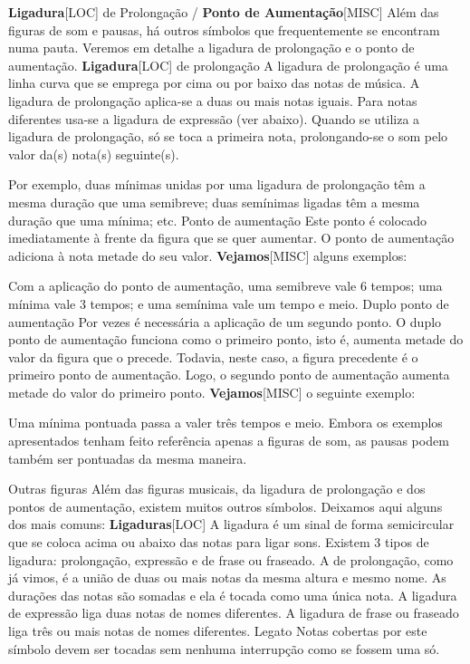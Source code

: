 \documentclass[a4paper,12pt]{article}
\begin{document}
\textbf{Ligadura}\textsc{[LOC]} de Prolongação / \textbf{Ponto de Aumentação}\textsc{[MISC]} Além das figuras de som e pausas, há outros símbolos que frequentemente se encontram numa pauta. Veremos em detalhe a ligadura de prolongação e o ponto de aumentação. \textbf{Ligadura}\textsc{[LOC]} de prolongação A ligadura de prolongação é uma linha curva que se emprega por cima ou por baixo das notas de música. A ligadura de prolongação aplica-se a duas ou mais notas iguais. Para notas diferentes usa-se a ligadura de expressão (ver abaixo). Quando se utiliza a ligadura de prolongação, só se toca a primeira nota, prolongando-se o som pelo valor da(s) nota(s) seguinte(s).

Por exemplo, duas mínimas unidas por uma ligadura de prolongação têm a mesma duração que uma semibreve; duas semínimas ligadas têm a mesma duração que uma mínima; etc. Ponto de aumentação Este ponto é colocado imediatamente à frente da figura que se quer aumentar. O ponto de aumentação adiciona à nota metade do seu valor. \textbf{Vejamos}\textsc{[MISC]} alguns exemplos:

Com a aplicação do ponto de aumentação, uma semibreve vale 6 tempos; uma mínima vale 3 tempos; e uma semínima vale um tempo e meio. Duplo ponto de aumentação Por vezes é necessária a aplicação de um segundo ponto. O duplo ponto de aumentação funciona como o primeiro ponto, isto é, aumenta metade do valor da figura que o precede. Todavia, neste caso, a figura precedente é o primeiro ponto de aumentação. Logo, o segundo ponto de aumentação aumenta metade do valor do primeiro ponto. \textbf{Vejamos}\textsc{[MISC]} o seguinte exemplo:

Uma mínima pontuada passa a valer três tempos e meio. Embora os exemplos apresentados tenham feito referência apenas a figuras de som, as pausas podem também ser pontuadas da mesma maneira.

Outras figuras Além das figuras musicais, da ligadura de prolongação e dos pontos de aumentação, existem muitos outros símbolos. Deixamos aqui alguns dos mais comuns: \textbf{Ligaduras}\textsc{[LOC]} A ligadura é um sinal de forma semicircular que se coloca acima ou abaixo das notas para ligar sons. Existem 3 tipos de ligadura: prolongação, expressão e de frase ou fraseado. A de prolongação, como já vimos, é a união de duas ou mais notas da mesma altura e mesmo nome. As durações das notas são somadas e ela é tocada como uma única nota. A ligadura de expressão liga duas notas de nomes diferentes. A ligadura de frase ou fraseado liga três ou mais notas de nomes diferentes. Legato Notas cobertas por este símbolo devem ser tocadas sem nenhuma interrupção como se fossem uma só.
\end{document}
